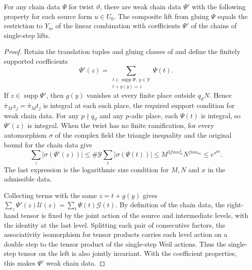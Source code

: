 \begin{lemma}
\label{lem:a-weak-chain-replacement}
\emitthmsource
For any chain data $\Psi$ for twist $\vartheta$, there are weak chain data $\Psi'$ with the following property for each source form $u\in U_0$. The composite lift from gluing $\Psi$ equals the restriction to $Y_m$ of the linear combination with coefficients $\Psi'$ of the chains of single-step lifts.
\end{lemma}
\begin{proof}
Retain the translation tuples and gluing classes of  and define the finitely supported coefficients
\[
  \Psi'(z)=
    \sum_{\substack{t\in\operatorname{supp}\Psi,\ y\in\mathcal Y\\
                    t+g(y)=z}}
           \Psi(t).
\]
If $z\in\operatorname{supp}\Psi'$, then $g(y)$ vanishes at every finite place outside $q_\vartheta N$. Hence $\bar\pi_M z_j=\bar\pi_M t_j$ is integral at each such place, the required support condition for weak chain data. For any $p\nmid q_\vartheta$ and any $p$-adic place, each $\Psi(t)$ is integral, so $\Psi'(z)$ is integral. When the twist has no finite ramification, for every automorphism $\sigma$ of the complex field the triangle inequality and the original bound for the chain data give
\[
 \sum_z|\sigma(\Psi'(z))|
 \le \#\mathcal Y\sum_t|\sigma(\Psi(t))|
 \le M^{3fmn_m^2}N^{fmn_m}
 \le e^{x^{60}} .
\]
The last expression is the logarithmic size condition for $M,N$ and $x$ in the admissible data.

Collecting terms with the same $z=t+g(y)$ gives
$\sum_z\Psi'(z)\mathcal U(z)=\sum_t\Psi(t)\mathcal G(t)$.
By definition of the chain data, the right-hand tensor is fixed by the joint action of the source and intermediate levels, with the identity at the last level. Splitting each pair of consecutive factors, the associativity isomorphism for tensor products carries each level action on a double step to the tensor product of the single-step Weil actions. Thus the single-step tensor on the left is also jointly invariant. With the coefficient properties, this makes $\Psi'$ weak chain data.


\end{proof}
